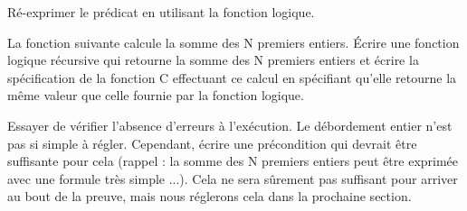 

Ré-exprimer le prédicat  en utilisant la fonction logique.



\label{l4:acsl-properties-functions-n-first-ints}


La fonction suivante calcule la somme des N premiers entiers. Écrire une fonction
logique récursive qui retourne la somme des N premiers entiers et écrire
la spécification de la fonction C effectuant ce calcul en spécifiant qu'elle
retourne la même valeur que celle fournie par la fonction logique.




Essayer de vérifier l'absence d'erreurs à l'exécution. Le débordement entier
n'est pas si simple à régler. Cependant, écrire une précondition qui devrait
être suffisante pour cela (rappel : la somme des N premiers entiers peut être
exprimée avec une formule très simple ...). Cela ne sera sûrement pas suffisant
pour arriver au bout de la preuve, mais nous réglerons cela dans la prochaine
section.
